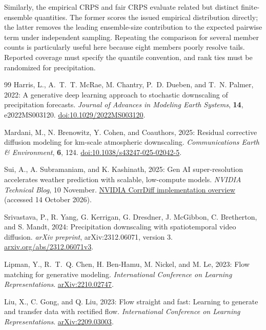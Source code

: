 \documentclass[10pt]{article}
\begin{document}
Similarly, the empirical CRPS and fair CRPS evaluate related but distinct finite-ensemble quantities. The former scores the issued empirical distribution directly; the latter removes the leading ensemble-size contribution to the expected pairwise term under independent sampling. Repeating the comparison for several member counts is particularly useful here because eight members poorly resolve tails. Reported coverage must specify the quantile convention, and rank ties must be randomized for precipitation.

\FloatBarrier
\begin{thebibliography}{99}
Harris, L., A.~T.~T. McRae, M. Chantry, P.~D. Dueben, and T.~N. Palmer, 2022:
A generative deep learning approach to stochastic downscaling of precipitation forecasts.
\emph{Journal of Advances in Modeling Earth Systems}, \textbf{14}, e2022MS003120.
\href{https://doi.org/10.1029/2022MS003120}{doi:10.1029/2022MS003120}.

Mardani, M., N. Brenowitz, Y. Cohen, and Coauthors, 2025:
Residual corrective diffusion modeling for km-scale atmospheric downscaling.
\emph{Communications Earth \& Environment}, \textbf{6}, 124.
\href{https://doi.org/10.1038/s43247-025-02042-5}{doi:10.1038/s43247-025-02042-5}.

Sui, A., A. Subramaniam, and K. Kashinath, 2025:
Gen AI super-resolution accelerates weather prediction with scalable, low-compute models.
\emph{NVIDIA Technical Blog}, 10 November.
\href{https://developer.nvidia.com/blog/gen-ai-super-resolution-accelerates-weather-prediction-with-scalable-low-compute-models/}{NVIDIA CorrDiff implementation overview} (accessed 14 October 2026).

Srivastava, P., R. Yang, G. Kerrigan, G. Dresdner, J. McGibbon, C. Bretherton, and S. Mandt, 2024:
Precipitation downscaling with spatiotemporal video diffusion.
\emph{arXiv preprint}, arXiv:2312.06071, version 3.
\href{https://arxiv.org/abs/2312.06071v3}{arxiv.org/abs/2312.06071v3}.

Lipman, Y., R.~T.~Q. Chen, H. Ben-Hamu, M. Nickel, and M. Le, 2023:
Flow matching for generative modeling.
\emph{International Conference on Learning Representations}.
\href{https://arxiv.org/abs/2210.02747}{arXiv:2210.02747}.

Liu, X., C. Gong, and Q. Liu, 2023:
Flow straight and fast: Learning to generate and transfer data with rectified flow.
\emph{International Conference on Learning Representations}.
\href{https://arxiv.org/abs/2209.03003}{arXiv:2209.03003}.


\end{thebibliography}
\end{document}
